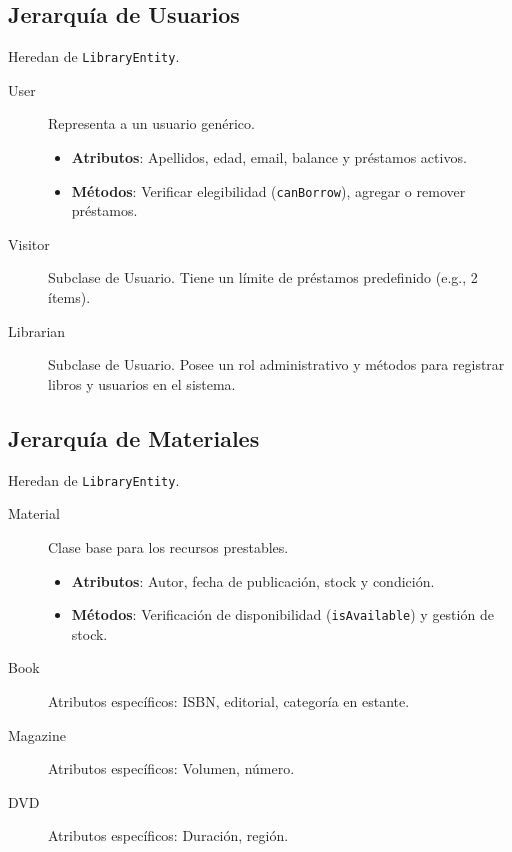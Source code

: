 \documentclass[stu, 12pt, letterpaper, donotrepeattitle]{apa7}
\begin{document}
    \subsection{Jerarquía de Usuarios}
    Heredan de \texttt{LibraryEntity}.
    \begin{description}
        \item[User] Representa a un usuario genérico.
        \begin{itemize}
            \item \textbf{Atributos}: Apellidos, edad, email, balance y préstamos activos.
            \item \textbf{Métodos}: Verificar elegibilidad (\texttt{canBorrow}), agregar o remover préstamos.
        \end{itemize}
        \item[Visitor] Subclase de Usuario. Tiene un límite de préstamos predefinido (e.g., 2 ítems).
        \item[Librarian] Subclase de Usuario. Posee un rol administrativo y métodos para registrar libros y usuarios en el sistema.
    \end{description}

    \subsection{Jerarquía de Materiales}
    Heredan de \texttt{LibraryEntity}.
    \begin{description}
        \item[Material] Clase base para los recursos prestables.
        \begin{itemize}
            \item \textbf{Atributos}: Autor, fecha de publicación, stock y condición.
            \item \textbf{Métodos}: Verificación de disponibilidad (\texttt{isAvailable}) y gestión de stock.
        \end{itemize}
        \item[Book] Atributos específicos: ISBN, editorial, categoría en estante.
        \item[Magazine] Atributos específicos: Volumen, número.
        \item[DVD] Atributos específicos: Duración, región.
    \end{description}
\end{document}
